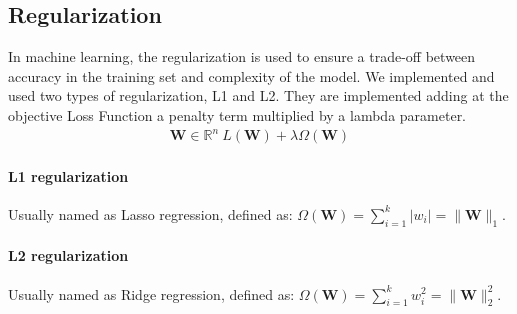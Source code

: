 \subsection{Regularization}
 In machine learning, the regularization is used to ensure a trade-off between accuracy in the training set and complexity of the model.
 We implemented and used two types of regularization, L1 and L2. They are implemented adding at the objective Loss Function a penalty term multiplied by a lambda parameter.
\begin{align*}
	{\mathbf{W} \in \mathbb{R}^n} {\ \mathit{L}(\mathbf{W}) + \lambda\Omega(\mathbf{W})}{}{}
	\label{eq:reg}
\end{align*}
 
\paragraph*{L1 regularization}
Usually named as Lasso regression, defined as:
$\Omega(\textbf{W}) = \sum_{i=1}^{k} |w_i| = \|\textbf{W}\|_1$.
\paragraph*{L2 regularization}
Usually named as Ridge regression, defined as:
$\Omega(\textbf{W}) = \sum_{i=1}^{k}w_i^2 = \|\textbf{W}\|_2^2$. 
 
 
